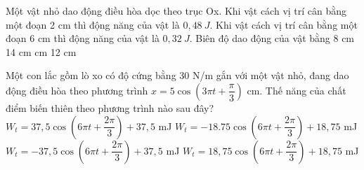 \begin{vidu} %
 Một vật nhỏ dao động điều hòa dọc theo trục Ox. Khi vật cách vị trí cân bằng một đoạn 2 cm thì động năng của vật là $0,48\ J$. Khi vật cách vị trí cân bằng một đoạn 6 cm thì động năng của vật là $0,32\ J$. Biên độ dao động của vật bằng
\choice
{8 cm}
{14 cm}
{ cm}
{12 cm}
\end{vidu} %

\begin{vidu}%
Một con lắc gồm lò xo có độ cứng bằng 30 N/m gắn với một vật nhỏ, đang dao động điều hòa theo phương trình $x = 5\cos(3\pi t + \dfrac{\pi}{3})$ cm. Thế năng của chất điểm biến thiên theo phương trình nào sau đây?
\choice
{$W_t = 37,5\cos(6\pi t + \dfrac{2\pi}{3}) + 37,5$ mJ}
{$W_t = -18.75\cos(6\pi t + \dfrac{2\pi}{3}) + 18,75$ mJ}
{$W_t = - 37,5\cos(6\pi t + \dfrac{2\pi}{3}) + 37,5$ mJ}
{\True $W_t = 18,75\cos(6\pi t + \dfrac{2\pi}{3}) + 18,75$ mJ}
\end{vidu} %
